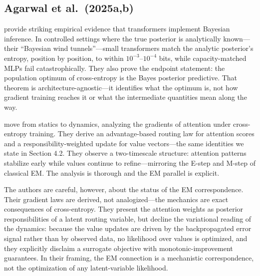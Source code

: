 \subsection{Agarwal et al.\ (2025a,b)}

\citet{agarwal2025geometry} provide striking empirical evidence that transformers implement Bayesian inference. In controlled settings where the true posterior is analytically known---their ``Bayesian wind tunnels''---small transformers match the analytic posterior's entropy, position by position, to within $10^{-3}$--$10^{-4}$ bits, while capacity-matched MLPs fail catastrophically. They also prove the endpoint statement: the population optimum of cross-entropy is the Bayes posterior predictive. That theorem is architecture-agnostic---it identifies what the optimum is, not how gradient training reaches it or what the intermediate quantities mean along the way.

\citet{agarwal2025gradient} move from statics to dynamics, analyzing the gradients of attention under cross-entropy training. They derive an advantage-based routing law for attention scores and a responsibility-weighted update for value vectors---the same identities we state in Section 4.2. They observe a two-timescale structure: attention patterns stabilize early while values continue to refine---mirroring the E-step and M-step of classical EM. The analysis is thorough and the EM parallel is explicit.

The authors are careful, however, about the status of the EM correspondence. Their gradient laws are derived, not analogized---the mechanics are exact consequences of cross-entropy. They present the attention weights as posterior responsibilities of a latent routing variable, but decline the variational reading of the dynamics: because the value updates are driven by the backpropagated error signal rather than by observed data, no likelihood over values is optimized, and they explicitly disclaim a surrogate objective with monotonic-improvement guarantees. In their framing, the EM connection is a mechanistic correspondence, not the optimization of any latent-variable likelihood.

